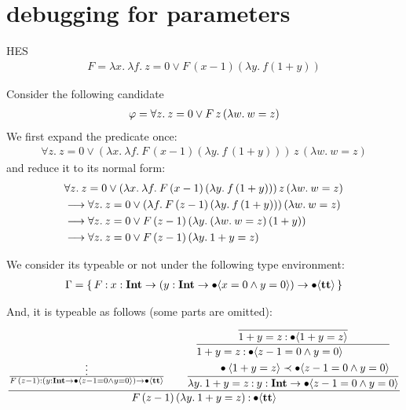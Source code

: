 \documentclass{article}
\begin{document}
\section{debugging for parameters}

HES
\begin{align*}
    F = \lambda x.\: \lambda f.\: z=0 \vee F\, (x-1) (\lambda y.\: f(1+y))
\end{align*}

Consider the following candidate
\begin{align*}
    \varphi = \forall z.\: z=0 \vee F\, z\, (\lambda w.\: w = z)
\end{align*}
We first expand the predicate once:
\begin{align*}
    \forall z.\: z =0\vee (\lambda x.\: \lambda f.\: F\, (x-1) (\lambda y.\: f\,(1+y)))\, z\, (\lambda w.\: w = z)
\end{align*}
and reduce it to its normal form:
\begin{align*}
    &\forall z.\: z=0 \vee (\lambda x.\: \lambda f.\: F\, (x-1)\, (\lambda y.\: f\,(1+y)))\, z\, (\lambda w.\: w = z) \\
    &\longrightarrow \forall z.\: z=0\vee (\lambda f.\: F\, (z-1)\, (\lambda y.\: f\,(1+y)))\, (\lambda w.\: w = z) \\
    &\longrightarrow \forall z.\: z=0 \vee F\, (z-1) \,(\lambda y.\: (\lambda w.\: w = z)\,(1+y))\\
    &\longrightarrow \forall z.\: z=0 \vee F\, (z-1)\, (\lambda y.\: 1+y = z)
\end{align*}

We consider its typeable or not under the following type environment:
\begin{align*}
    \Gamma = \{\, F \mathbin{:} {x} : \textbf{Int} \to ({y} : \textbf{Int} \to \bullet \langle x = 0 \wedge y = 0 \rangle) \to \bullet \langle \textbf{tt} \rangle \,\}
\end{align*}

And, it is typeable as follows (some parts are omitted):
\begin{equation*}
    \dfrac{
        \frac{
            \vdots
        }{
            F\, (z-1) \mathbin{:} ({y} : \textbf{Int} \to \bullet \langle z-1 = 0 \wedge y = 0 \rangle) \to \bullet \langle \textbf{tt} \rangle
        }
        \qquad
        \dfrac{
            \dfrac{
                \dfrac{
                }{
                    1 + y = z \mathbin{:} \bullet \langle 1 + y = z \rangle
                }
            }{
                \begin{aligned}
                    &1 + y = z \mathbin{:} \bullet \langle z-1 = 0 \wedge y = 0 \rangle \\
                    &\qquad \bullet \langle 1 + y = z \rangle \prec \bullet \langle z-1 = 0 \wedge y = 0 \rangle
                \end{aligned}
            }
        }{
            \lambda y.\: 1+y = z \mathbin{:} {y} : \textbf{Int} \to \bullet \langle z-1 = 0 \wedge y = 0 \rangle
        }
    }{
        F\, (z-1)\, (\lambda y.\: 1+y = z) \mathbin{:} \bullet \langle \textbf{tt} \rangle
    }
\end{equation*}
\end{document}
